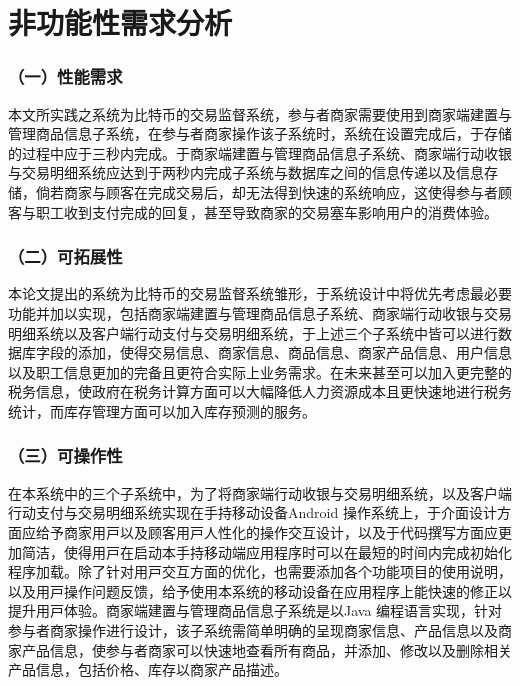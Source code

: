 	\section{非功能性需求分析}

	\subsubsection{（一）性能需求}
	
	本文所实践之系统为比特币的交易监督系统，参与者商家需要使用到商家端建置与管理商品信息子系统，在参与者商家操作该子系统时，系统在设置完成后，于存储的过程中应于三秒内完成。于商家端建置与管理商品信息子系统、商家端行动收银与交易明细系统应达到于两秒内完成子系统与数据库之间的信息传递以及信息存储，倘若商家与顾客在完成交易后，却无法得到快速的系统响应，这使得参与者顾客与职工收到⽀付完成的回复，甚至导致商家的交易塞车影响用户的消费体验。

	\subsubsection{（二）可拓展性}

	本论文提出的系统为比特币的交易监督系统雏形，于系统设计中将优先考虑最必要功能并加以实现，包括商家端建置与管理商品信息子系统、商家端行动收银与交易明细系统以及客户端行动支付与交易明细系统，于上述三个子系统中皆可以进行数据库字段的添加，使得交易信息、商家信息、商品信息、商家产品信息、用户信息以及职工信息更加的完备且更符合实际上业务需求。在未来甚⾄可以加⼊更完整的税务信息，使政府在税务计算⽅⾯可以大幅降低⼈⼒资源成本且更快速地进⾏税务统计，而库存管理⽅⾯可以加⼊库存预测的服务。

	\subsubsection{（三）可操作性}
	在本系统中的三个⼦系统中，为了将商家端⾏动收银与交易明细系统，以及客户端⾏动⽀付与交易明细系统实现在⼿持移动设备Android 操作系统上，于介⾯设计⽅⾯应给予商家⽤⼾以及顾客⽤⼾⼈性化的操作交互设计，以及于代码撰写⽅⾯应更加简洁，使得⽤⼾在启动本⼿持移动端应⽤程序时可以在最短的时间内完成初始化程序加载。除了针对⽤⼾交互⽅⾯的优化，也需要添加各个功能项⽬的使⽤说明，以及⽤⼾操作问题反馈，给予使用本系统的移动设备在应⽤程序上能快速的修正以提升⽤⼾体验。商家端建置与管理商品信息⼦系统是以Java 编程语⾔实现，针对参与者商家操作进⾏设计，该⼦系统需简单明确的呈现商家信息、产品信息以及商家产品信息，使参与者商家可以快速地查看所有商品，并添加、修改以及删除相关产品信息，包括价格、库存以商家产品描述。

